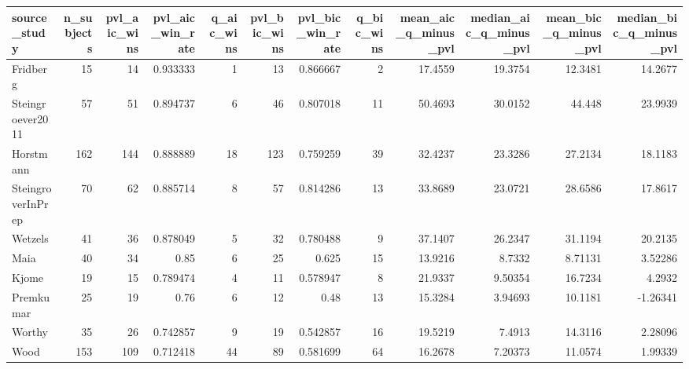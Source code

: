 \begin{tabular}{lrrrrrrrrrrr}
\toprule
source\_study & n\_subjects & pvl\_aic\_wins & pvl\_aic\_win\_rate & q\_aic\_wins & pvl\_bic\_wins & pvl\_bic\_win\_rate & q\_bic\_wins & mean\_aic\_q\_minus\_pvl & median\_aic\_q\_minus\_pvl & mean\_bic\_q\_minus\_pvl & median\_bic\_q\_minus\_pvl \\
\midrule
Fridberg & 15 & 14 & 0.933333 & 1 & 13 & 0.866667 & 2 & 17.4559 & 19.3754 & 12.3481 & 14.2677 \\
Steingroever2011 & 57 & 51 & 0.894737 & 6 & 46 & 0.807018 & 11 & 50.4693 & 30.0152 & 44.448 & 23.9939 \\
Horstmann & 162 & 144 & 0.888889 & 18 & 123 & 0.759259 & 39 & 32.4237 & 23.3286 & 27.2134 & 18.1183 \\
SteingroverInPrep & 70 & 62 & 0.885714 & 8 & 57 & 0.814286 & 13 & 33.8689 & 23.0721 & 28.6586 & 17.8617 \\
Wetzels & 41 & 36 & 0.878049 & 5 & 32 & 0.780488 & 9 & 37.1407 & 26.2347 & 31.1194 & 20.2135 \\
Maia & 40 & 34 & 0.85 & 6 & 25 & 0.625 & 15 & 13.9216 & 8.7332 & 8.71131 & 3.52286 \\
Kjome & 19 & 15 & 0.789474 & 4 & 11 & 0.578947 & 8 & 21.9337 & 9.50354 & 16.7234 & 4.2932 \\
Premkumar & 25 & 19 & 0.76 & 6 & 12 & 0.48 & 13 & 15.3284 & 3.94693 & 10.1181 & -1.26341 \\
Worthy & 35 & 26 & 0.742857 & 9 & 19 & 0.542857 & 16 & 19.5219 & 7.4913 & 14.3116 & 2.28096 \\
Wood & 153 & 109 & 0.712418 & 44 & 89 & 0.581699 & 64 & 16.2678 & 7.20373 & 11.0574 & 1.99339 \\
\bottomrule
\end{tabular}

